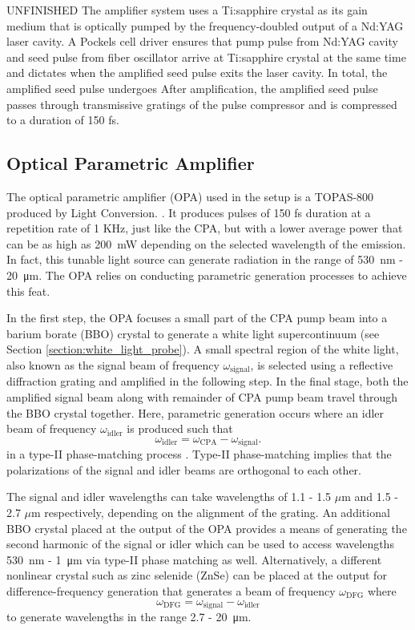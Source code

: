 {\color{red} UNFINISHED} The amplifier system uses a Ti:sapphire crystal as its gain medium that is optically pumped by the frequency-doubled output of a Nd:YAG laser cavity. A Pockels cell driver ensures that pump pulse from Nd:YAG cavity and seed pulse from fiber oscillator arrive at Ti:sapphire crystal at the same time and dictates when the amplified seed pulse exits the laser cavity. In total, the amplified seed pulse undergoes  After amplification, the amplified seed pulse passes through transmissive gratings of the pulse compressor and is compressed to a duration of 150 fs.

\subsection{Optical Parametric Amplifier}
\label{section:opa}

The optical parametric amplifier (OPA) used in the setup is a TOPAS-800 produced by Light Conversion. \cite{topas}. It produces pulses of 150 fs duration at a repetition rate of 1 KHz, just like the CPA, but with a lower average power that can be as high as \SI{200}{\milli\watt} depending on the selected wavelength of the emission. In fact, this tunable light source can generate radiation in the range of \SI{530}{\nano\meter} - \SI{20}{\micro\meter}. The OPA relies on conducting parametric generation processes to achieve this feat.

In the first step, the OPA focuses a small part of the CPA pump beam into a barium borate (BBO) crystal to generate a white light supercontinuum (see Section \ref{section:white_light_probe}). A small spectral region of the white light, also known as the signal beam of frequency $\omega_\text{signal}$, is selected using a reflective diffraction grating and amplified in the following step. In the final stage, both the amplified signal beam along with remainder of CPA pump beam travel through the BBO crystal together. Here, parametric generation occurs where an idler beam of frequency $\omega_\text{idler}$ is produced such that
\begin{equation}
	\omega_\text{idler} = \omega_\text{CPA} - \omega_\text{signal}.
\end{equation}
in a type-II phase-matching process \cite{dunn1999parametric}. Type-II phase-matching implies that the polarizations of the signal and idler beams are orthogonal to each other.

The signal and idler wavelengths can take wavelengths of 1.1 - 1.5 $\mu$m  and 1.5 - 2.7 $\mu$m respectively, depending on the alignment of the grating. An additional BBO crystal placed at the output of the OPA provides a means of generating the second harmonic of the signal or idler which can be used to access wavelengths \SI{530}{nm} - \SI{1}{\micro \meter} via type-II phase matching as well. Alternatively, a different nonlinear crystal such as zinc selenide (ZnSe) can be placed at the output for difference-frequency generation that generates a beam of frequency $\omega_\text{DFG}$ where
\begin{equation}
	\omega_\text{DFG} = \omega_\text{signal} - \omega_\text{idler}
\end{equation}
to generate wavelengths in the range 2.7 - \SI{20}{\micro\meter}.
